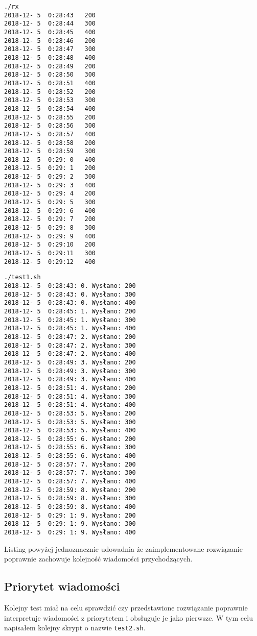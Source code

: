 \documentclass{mwrep}
\begin{document}
\begin{paracol}{2}
\begin{verbatim}
./rx
2018-12- 5  0:28:43   200
2018-12- 5  0:28:44   300
2018-12- 5  0:28:45   400
2018-12- 5  0:28:46   200
2018-12- 5  0:28:47   300
2018-12- 5  0:28:48   400
2018-12- 5  0:28:49   200
2018-12- 5  0:28:50   300
2018-12- 5  0:28:51   400
2018-12- 5  0:28:52   200
2018-12- 5  0:28:53   300
2018-12- 5  0:28:54   400
2018-12- 5  0:28:55   200
2018-12- 5  0:28:56   300
2018-12- 5  0:28:57   400
2018-12- 5  0:28:58   200
2018-12- 5  0:28:59   300
2018-12- 5  0:29: 0   400
2018-12- 5  0:29: 1   200
2018-12- 5  0:29: 2   300
2018-12- 5  0:29: 3   400
2018-12- 5  0:29: 4   200
2018-12- 5  0:29: 5   300
2018-12- 5  0:29: 6   400
2018-12- 5  0:29: 7   200
2018-12- 5  0:29: 8   300
2018-12- 5  0:29: 9   400
2018-12- 5  0:29:10   200
2018-12- 5  0:29:11   300
2018-12- 5  0:29:12   400
\end{verbatim}
\switchcolumn
\begin{verbatim}
./test1.sh
2018-12- 5  0:28:43: 0. Wysłano: 200
2018-12- 5  0:28:43: 0. Wysłano: 300
2018-12- 5  0:28:43: 0. Wysłano: 400
2018-12- 5  0:28:45: 1. Wysłano: 200
2018-12- 5  0:28:45: 1. Wysłano: 300
2018-12- 5  0:28:45: 1. Wysłano: 400
2018-12- 5  0:28:47: 2. Wysłano: 200
2018-12- 5  0:28:47: 2. Wysłano: 300
2018-12- 5  0:28:47: 2. Wysłano: 400
2018-12- 5  0:28:49: 3. Wysłano: 200
2018-12- 5  0:28:49: 3. Wysłano: 300
2018-12- 5  0:28:49: 3. Wysłano: 400
2018-12- 5  0:28:51: 4. Wysłano: 200
2018-12- 5  0:28:51: 4. Wysłano: 300
2018-12- 5  0:28:51: 4. Wysłano: 400
2018-12- 5  0:28:53: 5. Wysłano: 200
2018-12- 5  0:28:53: 5. Wysłano: 300
2018-12- 5  0:28:53: 5. Wysłano: 400
2018-12- 5  0:28:55: 6. Wysłano: 200
2018-12- 5  0:28:55: 6. Wysłano: 300
2018-12- 5  0:28:55: 6. Wysłano: 400
2018-12- 5  0:28:57: 7. Wysłano: 200
2018-12- 5  0:28:57: 7. Wysłano: 300
2018-12- 5  0:28:57: 7. Wysłano: 400
2018-12- 5  0:28:59: 8. Wysłano: 200
2018-12- 5  0:28:59: 8. Wysłano: 300
2018-12- 5  0:28:59: 8. Wysłano: 400
2018-12- 5  0:29: 1: 9. Wysłano: 200
2018-12- 5  0:29: 1: 9. Wysłano: 300
2018-12- 5  0:29: 1: 9. Wysłano: 400
\end{verbatim}
\end{paracol}

Listing powyżej jednoznacznie udowadnia że zaimplementowane rozwiązanie
poprawnie zachowuje kolejność wiadomości przychodzących.

\newpage
\subsection{Priorytet wiadomości}
Kolejny test miał na celu sprawdzić czy przedstawione rozwiązanie poprawnie interpretuje wiadomości
z priorytetem i obsługuje je jako pierwsze. W tym celu napisałem kolejny skrypt o nazwie \texttt{test2.sh}.
\end{document}

